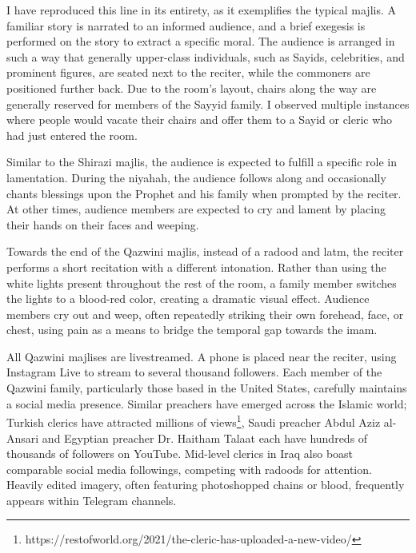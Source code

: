 I have reproduced this line in its entirety, as it exemplifies the typical majlis. A familiar story is narrated to an informed audience, and a brief exegesis is performed on the story to extract a specific moral. The audience is arranged in such a way that generally upper-class individuals, such as Sayids, celebrities, and prominent figures, are seated next to the reciter, while the commoners are positioned further back. Due to the room's layout, chairs along the way are generally reserved for members of the Sayyid family. I observed multiple instances where people would vacate their chairs and offer them to a Sayid or cleric who had just entered the room.

Similar to the Shirazi majlis, the audience is expected to fulfill a specific role in lamentation. During the niyahah, the audience follows along and occasionally chants blessings upon the Prophet and his family when prompted by the reciter. At other times, audience members are expected to cry and lament by placing their hands on their faces and weeping.

Towards the end of the Qazwini majlis, instead of a radood and latm, the reciter performs a short recitation with a different intonation. Rather than using the white lights present throughout the rest of the room, a family member switches the lights to a blood-red color, creating a dramatic visual effect. Audience members cry out and weep, often repeatedly striking their own forehead, face, or chest, using pain as a means to bridge the temporal gap towards the imam.

All Qazwini majlises are livestreamed. A phone is placed near the reciter, using Instagram Live to stream to several thousand followers. Each member of the Qazwini family, particularly those based in the United States, carefully maintains a social media presence. Similar preachers have emerged across the Islamic world; Turkish clerics have attracted millions of views\footnote{https://restofworld.org/2021/the-cleric-has-uploaded-a-new-video/}, Saudi preacher Abdul Aziz al-Ansari and Egyptian preacher Dr. Haitham Talaat each have hundreds of thousands of followers on YouTube. Mid-level clerics in Iraq also boast comparable social media followings, competing with radoods for attention. Heavily edited imagery, often featuring photoshopped chains or blood, frequently appears within Telegram channels.

